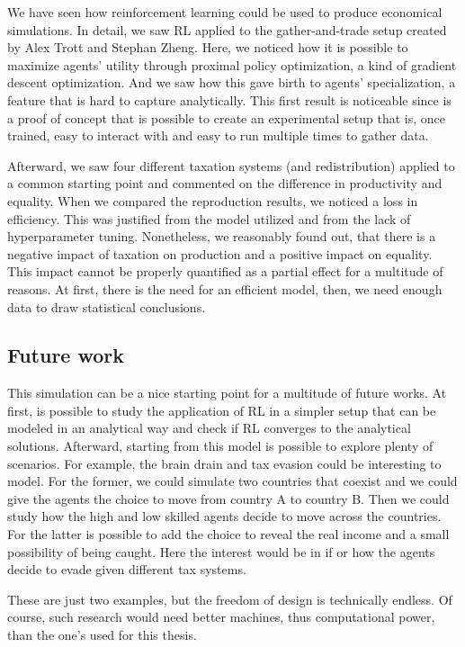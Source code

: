 
We have seen how reinforcement learning could be used to produce economical simulations. In detail, we saw RL applied to the gather-and-trade setup created by Alex Trott and Stephan Zheng. Here, we noticed how it is possible to maximize agents' utility through proximal policy optimization, a kind of gradient descent optimization. And we saw how this gave birth to agents' specialization, a feature that is hard to capture analytically. This first result is noticeable since is a proof of concept that is possible to create an experimental setup that is, once trained, easy to interact with and easy to run multiple times to gather data.

Afterward, we saw four different taxation systems (and redistribution) applied to a common starting point and commented on the difference in productivity and equality. When we compared the reproduction results, we noticed a loss in efficiency. This was justified from the model utilized and from the lack of hyperparameter tuning. Nonetheless, we reasonably found out, that there is a negative impact of taxation on production and a positive impact on equality. This impact cannot be properly quantified as a partial effect for a multitude of reasons. At first, there is the need for an efficient model, then, we need enough data to draw statistical conclusions. 


\subsection*{Future work}

This simulation can be a nice starting point for a multitude of future works. At first, is possible to study the application of RL in a simpler setup that can be modeled in an analytical way and check if RL converges to the analytical solutions. Afterward, starting from this model is possible to explore plenty of scenarios. For example, the brain drain and tax evasion could be interesting to model. For the former, we could simulate two countries that coexist and we could give the agents the choice to move from country A to country B. Then we could study how the high and low skilled agents decide to move across the countries. For the latter is possible to add the choice to reveal the real income and a small possibility of being caught. Here the interest would be in if or how the agents decide to evade given different tax systems. 

These are just two examples, but the freedom of design is technically endless. Of course, such research would need better machines, thus computational power, than the one's used for this thesis.